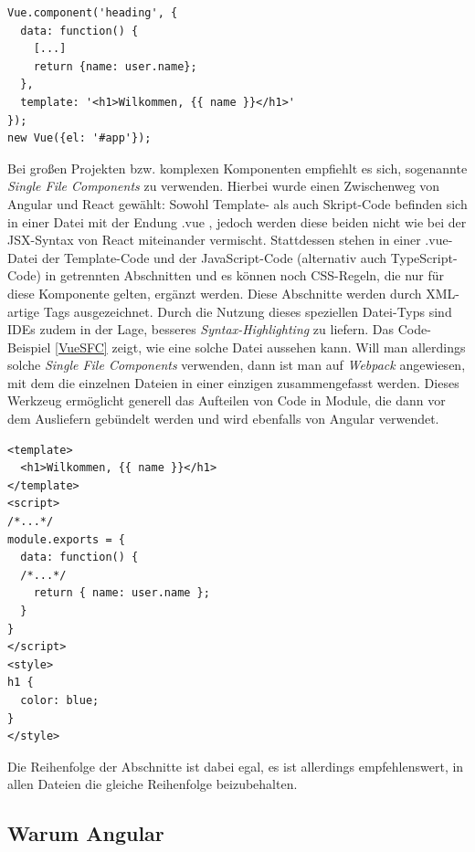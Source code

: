 \begin{lstlisting}[float, floatplacement=h, style=htmlcssjs, caption={Code-Beispiel für ein \textit{Component} in Vue.Js}, label={VueComponent}]
Vue.component('heading', {
  data: function() {
    [...]
    return {name: user.name};
  },
  template: '<h1>Wilkommen, {{ name }}</h1>'
});
new Vue({el: '#app'});
\end{lstlisting}
Bei großen Projekten bzw. komplexen Komponenten empfiehlt es sich, sogenannte \textit{Single File Components} zu verwenden. Hierbei wurde einen Zwischenweg von Angular und React gewählt: Sowohl Template- als auch Skript-Code befinden sich in einer Datei mit der Endung .vue , jedoch werden diese beiden nicht wie bei der \acs{JSX}-Syntax von React miteinander vermischt. Stattdessen stehen in einer .vue-Datei der Template-Code und der JavaScript-Code (alternativ auch TypeScript-Code) in getrennten Abschnitten und es können noch \acs{CSS}-Regeln, die nur für diese Komponente gelten, ergänzt werden. Diese Abschnitte werden durch \acs{XML}-artige Tags ausgezeichnet. Durch die Nutzung dieses speziellen Datei-Typs sind IDEs zudem in der Lage, besseres \textit{Syntax-Highlighting} zu liefern. Das Code-Beispiel  \ref{VueSFC} zeigt, wie eine solche Datei aussehen kann. Will man allerdings solche \textit{Single File Components} verwenden, dann ist man auf \textit{Webpack} angewiesen, mit dem die einzelnen Dateien in einer einzigen zusammengefasst werden. Dieses Werkzeug ermöglicht generell das Aufteilen von Code in Module, die dann vor dem Ausliefern gebündelt werden und wird ebenfalls von Angular verwendet.

\begin{lstlisting}[float, floatplacement=h, style=htmlcssjs, caption={Code-Beispiel für ein \textit{Single File Component} in Vue.Js}, label={VueSFC}]
<template>
  <h1>Wilkommen, {{ name }}</h1>
</template>
<script>
/*...*/
module.exports = {
  data: function() {
  /*...*/
    return { name: user.name };
  }	
}
</script>
<style>
h1 {
  color: blue;	
}
</style>
\end{lstlisting}
Die Reihenfolge der Abschnitte ist dabei egal, es ist allerdings empfehlenswert, in allen Dateien die gleiche Reihenfolge beizubehalten\cite{VueSFC}.

\subsection{Warum Angular}
\label{sec:technologies:frameworks:why}

